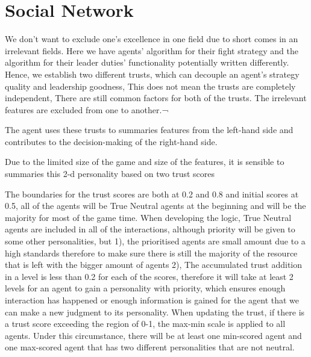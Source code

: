 \section{Social Network}

We don’t want to exclude one’s excellence in one field due to short comes in an irrelevant fields.
Here we have agents’ algorithm for their fight strategy and the algorithm for their leader duties’ functionality potentially written differently. 
Hence, we establish two different trusts, which can decouple an agent’s strategy quality and leadership goodness, 
This does not mean the trusts are completely independent, 
There are still common factors for both of the trusts.
The irrelevant features are excluded from one to another.¬

The agent uses these trusts to summaries features from the left-hand side and contributes to the decision-making of the right-hand side. 

Due to the limited size of the game and size of the features, it is sensible to summaries this 2-d personality based on two trust scores

The boundaries for the trust scores are both at 0.2 and 0.8 and initial scores at 0.5, all of the agents will be True Neutral agents at the beginning and will be the majority for most of the game time. When developing the logic, True Neutral agents are included in all of the interactions, although priority will be given to some other personalities, but 1), the prioritised agents are small amount due to a high standards therefore to make sure there is still the majority of the resource that is left with the bigger amount of agents 2), The accumulated trust addition in a level is less than 0.2 for each of the scores, therefore it will take at least 2 levels for an agent to gain a personality with priority, which ensures enough interaction has happened or enough information is gained for the agent that we can make a new judgment to its personality. When updating the trust, if there is a trust score exceeding the region of 0-1, the max-min scale is applied to all agents. Under this circumstance, there will be at least one min-scored agent and one max-scored agent that has two different personalities that are not neutral. 

\newpage

